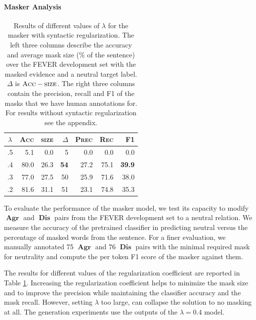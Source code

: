\documentclass[letterpaper]{article} %
\DeclareMathOperator{\A}{\boldsymbol{Agr}}
\DeclareMathOperator{\D}{\boldsymbol{Dis}}
\begin{document}
\paragraph{Masker Analysis}

\begin{table}[t]
\centering
\begin{tabular}{c|rrr|rrr}
\toprule
$\lambda$ & \textsc{Acc} & \textsc{size} & $\Delta$ & \textsc{Prec} & \textsc{Rec} & \textsc{F1}   \\ \midrule
.5 & 5.1      & 0.0         & 5   & 0.0    & 0.0      & 0.0    \\ 
.4 & 80.0       & 26.3      & \textbf{54}  & 27.2 & 75.1   & \textbf{39.9} \\ 
.3 & 77.0       & 27.5      & 50  & 25.9 & 71.6   & 38.0   \\ 
.2 & 81.6     & 31.1      & 51  & 23.1 & 74.8   & 35.3 \\ 
\bottomrule
\end{tabular}
\caption{Results of different values of $\lambda$ for the masker with syntactic regularization. The left three columns describe the accuracy and average mask size (\% of the sentence) over the FEVER development set with the masked evidence and a neutral target label. $\Delta$ is $\textsc{Acc}-\textsc{size}$. The right three columns contain the precision, recall and F1 of the masks that we have human annotations for. For results without syntactic regularization see the appendix.}
\label{tab:mask_res}
\end{table}


To evaluate the performance of the masker model, we test its capacity to modify $\A$ and $\D$ pairs from the FEVER development set to a neutral relation. We measure the accuracy of the pretrained classifier in predicting neutral versus the percentage of masked words from the sentence. For a finer evaluation, we manually annotated 75 $\A$ and 76 $\D$ pairs with the minimal required mask for neutrality and compute the per token \textsc{F1} score of the masker against them.

The results for different values of the regularization coefficient are reported in Table \ref{tab:mask_res}. Increasing the regularization coefficient helps to minimize the mask size and to improve the precision while maintaining the classifier accuracy and the mask recall. However, setting $\lambda$ too large, can collapse the solution to no masking at all. The generation experiments use the outputs of the $\lambda=0.4$ model.
\end{document}
